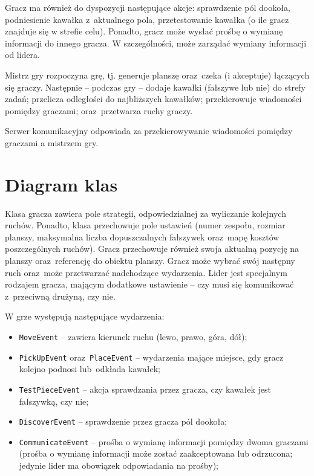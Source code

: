 \documentclass[a4paper]{article}
\newcommand{\code}{\texttt}
\begin{document}
Gracz ma również do dyspozycji następujące akcje: sprawdzenie pól dookoła, podniesienie kawałka z~aktualnego pola, przetestowanie kawałka (o ile gracz znajduje się w strefie celu).
Ponadto, gracz może wysłać prośbę o wymianę informacji do innego gracza.
W szczególności, może zarządać wymiany informacji od lidera.



Mistrz gry rozpoczyna grę, tj. generuje planszę oraz~czeka (i akceptuje) łączących się graczy.
Następnie -- podczas gry -- dodaje kawałki (fałszywe lub nie) do strefy zadań; przelicza odległości do najbliższych kawałków; przekierowuje wiadomości pomiędzy graczami; oraz~przetwarza ruchy graczy.



Serwer komunikacyjny odpowiada za przekierowywanie wiadomości pomiędzy graczami a mistrzem gry.

\section{Diagram klas}


Klasa gracza zawiera pole strategii, odpowiedzialnej za wyliczanie kolejnych ruchów.
Ponadto, klasa przechowuje pole ustawień (numer zespołu, rozmiar planszy, maksymalna liczba dopuszczalnych fałszywek oraz~mapę kosztów poszczególnych ruchów).
Gracz przechowuje również swoja aktualną pozycję na planszy oraz~referencję do obiektu planszy.
Gracz może wybrać swój następny ruch oraz~może przetwarzać nadchodzące wydarzenia.
Lider jest specjalnym rodzajem gracza, mającym dodatkowe ustawienie -- czy musi się komunikować z~przeciwną drużyną, czy nie.

\hfill 

W grze występują następujące wydarzenia:
\begin{itemize}
	\item \code{MoveEvent} -- zawiera kierunek ruchu (lewo, prawo, góra, dół);
	\item \code{PickUpEvent} oraz~\code{PlaceEvent} -- wydarzenia mające miejsce, gdy gracz kolejno podnosi lub~odkłada kawałek;
	\item \code{TestPieceEvent} -- akcja sprawdzania przez gracza, czy kawałek jest fałszywką, czy nie;
	\item \code{DiscoverEvent} -- sprawdzenie przez gracza pól dookoła;
	\item \code{CommunicateEvent} -- prośba o wymianę informacji pomiędzy dwoma graczami (prośba o wymianę informacji może zostać zaakceptowana lub odrzucona; jedynie lider ma obowiązek odpowiadania na prośby);
\end{itemize}
\end{document}
